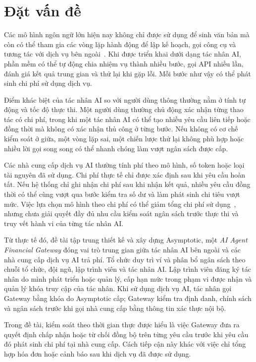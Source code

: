 
\section{Đặt vấn đề}

Các mô hình ngôn ngữ lớn hiện nay không chỉ được sử dụng để sinh văn bản mà còn có thể tham gia các vòng lặp hành động để lập kế hoạch, gọi công cụ và tương tác với dịch vụ bên ngoài~\cite{Yao2022ReAct,Schick2023Toolformer}. Khi được triển khai dưới dạng tác nhân AI, phần mềm có thể tự động chia nhiệm vụ thành nhiều bước, gọi API nhiều lần, đánh giá kết quả trung gian và thử lại khi gặp lỗi. Mỗi bước như vậy có thể phát sinh chi phí sử dụng dịch vụ.

Điểm khác biệt của tác nhân AI so với người dùng thông thường nằm ở tính tự động và tốc độ thực thi. Một người dùng thường chủ động xác nhận từng thao tác có chi phí, trong khi một tác nhân AI có thể tạo nhiều yêu cầu liên tiếp hoặc đồng thời mà không có xác nhận thủ công ở từng bước. Nếu không có cơ chế kiểm soát ở giữa, một vòng lặp sai, một chiến lược thử lại không phù hợp hoặc nhiều lời gọi song song có thể nhanh chóng làm vượt ngân sách được cấp.

Các nhà cung cấp dịch vụ AI thường tính phí theo mô hình, số token hoặc loại tài nguyên đã sử dụng. Chi phí thực tế chỉ được xác định sau khi yêu cầu hoàn tất. Nếu hệ thống chỉ ghi nhận chi phí sau khi nhận kết quả, nhiều yêu cầu đồng thời có thể cùng vượt qua bước kiểm tra số dư và làm phát sinh chi tiêu vượt mức. Việc lựa chọn mô hình theo chi phí có thể giảm tổng chi phí sử dụng~\cite{Chen2023FrugalGPT}, nhưng chưa giải quyết đầy đủ nhu cầu kiểm soát ngân sách trước thực thi và truy vết hành vi của từng tác nhân AI.

Từ thực tế đó, đề tài tập trung thiết kế và xây dựng Asymptotic, một \textit{AI Agent Financial Gateway} đóng vai trò trung gian giữa tác nhân AI bên ngoài và các nhà cung cấp dịch vụ AI trả phí. Tổ chức duy trì ví và phân bổ ngân sách theo chuỗi tổ chức, đội ngũ, lập trình viên và tác nhân AI. Lập trình viên đăng ký tác nhân do mình phát triển hoặc quản lý, cấp hạn mức trong phạm vi được nhận và quản lý khóa truy cập của tác nhân. Khi sử dụng dịch vụ AI, tác nhân gọi Gateway bằng khóa do Asymptotic cấp; Gateway kiểm tra định danh, chính sách và ngân sách trước khi gọi nhà cung cấp bằng thông tin xác thực nội bộ.

Trong đề tài, kiểm soát theo thời gian thực được hiểu là việc Gateway đưa ra quyết định chấp nhận hoặc từ chối đồng bộ trên từng yêu cầu trước khi yêu cầu đó phát sinh chi phí tại nhà cung cấp. Cách tiếp cận này khác với việc chỉ tổng hợp hóa đơn hoặc cảnh báo sau khi dịch vụ đã được sử dụng.

